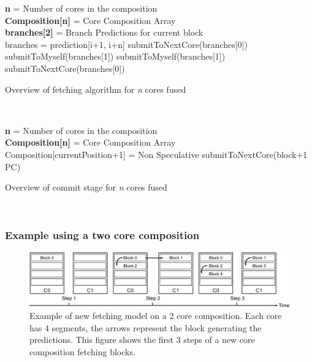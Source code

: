 \begin{algorithm}[t]

\textbf{n} = Number of cores in the composition\\
\textbf{Composition[n]} = Core Composition Array\\
\textbf{branches[2]} = Branch Predictions for current block\\

{
{
	branches = prediction[i+1, i+n]
}
{
	{
		submitToNextCore(branches[0])\\
		submitToMyself(branches[1])
	}
	{
		submitToMyself(branches[1])\\
	}
}
{
	{
		submitToNextCore(branches[0])\\
	}
}	
}
\caption{Overview of fetching algorithm for \textit{n} cores fused}~\label{alg:fetch}
\end{algorithm}

\begin{algorithm}[t]
\textbf{n} = Number of cores in the composition\\
\textbf{Composition[n]} = Core Composition Array\\

{
	{
		Composition[currentPosition+1] = Non Speculative\;
	}
	{
		submitToNextCore(block+1 PC)
	}
}
\caption{Overview of commit stage for \textit{n} cores fused}~\label{alg:commit}
\end{algorithm}


\subsubsection{Example using a two core composition}

\begin{figure}[t]
    \centering
    \includegraphics[width=1\textwidth]{chapter3/graphics/fetching-model.pdf}

    \caption{Example of new fetching model on a 2 core composition. Each core has 4 segments, the arrows represent the block generating the predictions. This figure shows the first 3 steps of a new core composition fetching blocks.}
    \label{fig:new_fetch_ex}
\vspace{1em}
	\end{figure}
	
